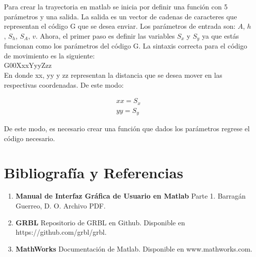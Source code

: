 \documentclass{article}
\begin{document}
\begin{multicols}{2}
Para crear la trayectoria en matlab se inicia por definir una función con 5 parámetros y una salida. La salida es un vector de cadenas de caracteres que representan el código G que se desea enviar. Los parámetros de entrada son: $A$, $h$, $S_h$, $S_A$, $v$. Ahora, el primer paso es definir las variables $S_x$ y $S_{y}$ ya que estás funcionan como los parámetros del código G. La sintaxis correcta para el código de movimiento es la siguiente:\\

G00XxxYyyZzz\\

En donde xx, yy y zz representan la distancia que se desea mover en las respectivas coordenadas. De este modo:

\begin{eqnarray}
xx=S_x\\
yy=S_y
\end{eqnarray}

De este modo, es necesario crear una función que dados los parámetros regrese el código necesario.

{\centering \section{Bibliografía y Referencias}}
\begin{enumerate}
\item \textbf{Manual de Interfaz Gráfica de Usuario en Matlab} Parte 1. Barragán Guerreo, D. O. Archivo PDF.
\item \textbf{GRBL} Repositorio de GRBL en Github. Disponible en https://github.com/grbl/grbl.
\item \textbf{MathWorks} Documentación de Matlab. Disponible en www.mathworks.com.
\end{enumerate}
\end{multicols}
\end{document}
